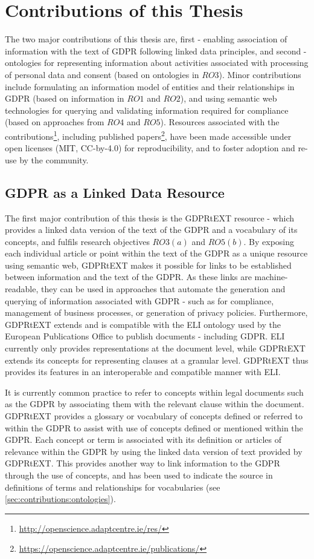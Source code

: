 \section{Contributions of this Thesis}\label{sec:intro:contributions}
The two major contributions of this thesis are, first - enabling association of information with the text of GDPR following linked data principles, and second - ontologies for representing information about activities associated with processing of personal data and consent (based on ontologies in $RO3$). Minor contributions include formulating an information model of entities and their relationships in GDPR (based on information in $RO1$ and $RO2$), and using semantic web technologies for querying and validating information required for compliance (based on approaches from $RO4$ and $RO5$). Resources associated with the contributions\footnote{\url{http://openscience.adaptcentre.ie/res/}}, including published papers\footnote{\url{https://openscience.adaptcentre.ie/publications/}}, have been made accessible under open licenses (MIT,  CC-by-4.0) for reproducibility, and to foster adoption and re-use by the community.

\subsection{GDPR as a Linked Data Resource}
The first major contribution of this thesis is the GDPRtEXT resource - which provides a linked data version of the text of the GDPR and a vocabulary of its concepts, and fulfils research objectives $RO3(a)$ and $RO5(b)$. By exposing each individual article or point within the text of the GDPR as a unique resource using semantic web, GDPRtEXT makes it possible for links to be established between information and the text of the GDPR. As these links are machine-readable, they can be used in approaches that automate the generation and querying of information associated with GDPR - such as for compliance, management of business processes, or generation of privacy policies. Furthermore, GDPRtEXT extends and is compatible with the ELI ontology \cite{thomas_european_2019} used by the European Publications Office to publish documents - including GDPR. ELI currently only provides representations at the document level, while GDPRtEXT extends its concepts for representing clauses at a granular level. GDPRtEXT thus provides its features in an interoperable and compatible manner with ELI.

It is currently common practice to refer to concepts within legal documents such as the GDPR by associating them with the relevant clause within the document. 
GDPRtEXT provides a glossary or vocabulary of concepts defined or referred to within the GDPR to assist with use of concepts defined or mentioned within the GDPR. Each concept or term is associated with its definition or articles of relevance within the GDPR by using the linked data version of text provided by GDPRtEXT. This provides another way to link information to the GDPR through the use of concepts, and has been used to indicate the source in definitions of terms and relationships for vocabularies (see \autoref{sec:contributions:ontologies}).

